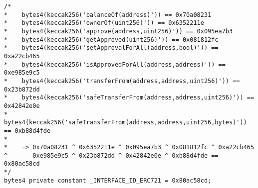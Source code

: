 \begin{lstlisting}[language=Solidity, basicstyle=\tiny]
/*
*    bytes4(keccak256('balanceOf(address)')) == 0x70a08231
*    bytes4(keccak256('ownerOf(uint256)')) == 0x6352211e
*    bytes4(keccak256('approve(address,uint256)')) == 0x095ea7b3
*    bytes4(keccak256('getApproved(uint256)')) == 0x081812fc
*    bytes4(keccak256('setApprovalForAll(address,bool)')) == 0xa22cb465
*    bytes4(keccak256('isApprovedForAll(address,address)')) == 0xe985e9c5
*    bytes4(keccak256('transferFrom(address,address,uint256)')) == 0x23b872dd
*    bytes4(keccak256('safeTransferFrom(address,address,uint256)')) == 0x42842e0e
*    bytes4(keccak256('safeTransferFrom(address,address,uint256,bytes)')) == 0xb88d4fde
*
*    => 0x70a08231 ^ 0x6352211e ^ 0x095ea7b3 ^ 0x081812fc ^ 0xa22cb465 ^       0xe985e9c5 ^ 0x23b872dd ^ 0x42842e0e ^ 0xb88d4fde == 0x80ac58cd
*/
bytes4 private constant _INTERFACE_ID_ERC721 = 0x80ac58cd;
    
  \end{lstlisting}